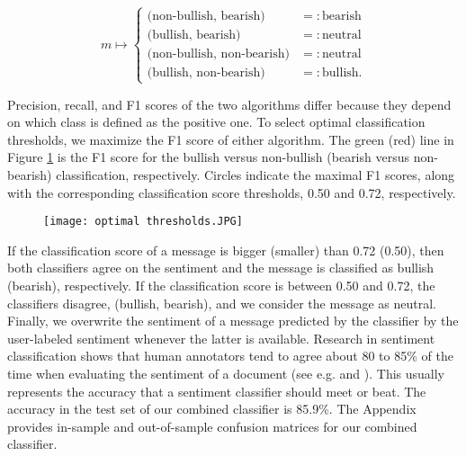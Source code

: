 \[ m\mapsto \begin{cases} \text{(non-bullish, bearish)} & =: \text{bearish} \\ \text{(bullish, bearish)}& =: \text{neutral} \\ \text{(non-bullish, non-bearish)}& =: \text{neutral} \\ \text{(bullish, non-bearish)} &=: \text{bullish.} \end{cases}\] 

Precision, recall, and F1 scores of the two algorithms differ because they depend on which class is defined as the positive one. To select optimal classification thresholds, we maximize the F1 score of either algorithm. The green (red) line in Figure \ref{fig:optimal_thresholds} is the F1 score for the bullish versus non-bullish (bearish versus non-bearish) classification, respectively. Circles indicate the maximal F1 scores, along with the corresponding classification score thresholds, 0.50 and 0.72, respectively. 

\begin{figure}[h]
    \centering
    \texttt{[image: optimal thresholds.JPG]}
    \label{fig:optimal_thresholds}
\end{figure}


If the classification score of a message is bigger (smaller) than 0.72 (0.50), then both classifiers agree on the sentiment and the message is classified as bullish (bearish), respectively. If the classification score is between 0.50 and 0.72, the classifiers disagree, (bullish, bearish), and we consider the message as neutral. Finally, we overwrite the sentiment of a message predicted by the classifier by the user-labeled sentiment whenever the latter is available. Research in sentiment classification shows that human annotators tend to agree about 80 to 85\% of the time when evaluating the sentiment of a document (see e.g. \citet{wilson2005recognizing} and \citet{chen2020large}). This usually represents the accuracy that a sentiment classifier should meet or beat. The accuracy in the test set of our combined classifier is 85.9\%. The Appendix provides in-sample and out-of-sample confusion matrices for our combined classifier.


